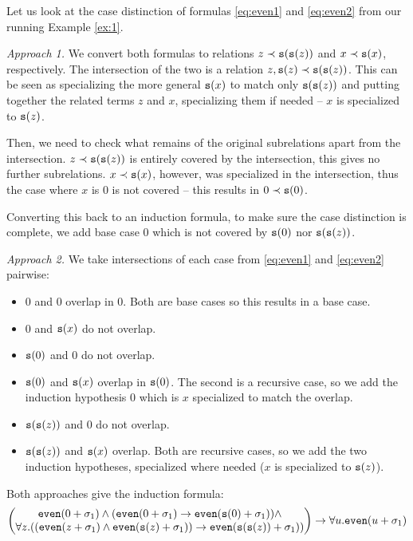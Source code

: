 \begin{example}
	Let us look at the case distinction of formulas \eqref{eq:even1} and \eqref{eq:even2} from our running Example \ref{ex:1}.

	\textit{Approach 1.} We convert both formulas to relations $z\prec\mathtt{s}(\mathtt{s}(z))$ and $x\prec\mathtt{s}(x)$, respectively. The intersection of the two is a relation $z,\mathtt{s}(z)\prec\mathtt{s}(\mathtt{s}(z))$. This can be seen as specializing the more general $\mathtt{s}(x)$ to match only $\mathtt{s}(\mathtt{s}(z))$ and putting together the related terms $z$ and $x$, specializing them if needed -- $x$ is specialized to $\mathtt{s}(z)$.

	Then, we need to check what remains of the original subrelations apart from the intersection. $z\prec\mathtt{s}(\mathtt{s}(z))$ is entirely covered by the intersection, this gives no further subrelations. $x\prec\mathtt{s}(x)$, however, was specialized in the intersection, thus the case where $x$ is 0 is not covered -- this results in $0\prec\mathtt{s}(0)$.

	Converting this back to an induction formula, to make sure the case distinction is complete, we add base case 0 which is not covered by $\mathtt{s}(0)$ nor $\mathtt{s}(\mathtt{s}(z))$.

	\textit{Approach 2.} We take intersections of each case from \eqref{eq:even1} and \eqref{eq:even2} pairwise:
	\begin{itemize}
		\item $0$ and $0$ overlap in $0$. Both are base cases so this results in a base case.
		\item $0$ and $\mathtt{s}(x)$ do not overlap.
		\item $\mathtt{s}(0)$ and $0$ do not overlap.
		\item $\mathtt{s}(0)$ and $\mathtt{s}(x)$ overlap in $\mathtt{s}(0)$. The second is a recursive case, so we add the induction hypothesis $0$ which is $x$ specialized to match the overlap.
		\item $\mathtt{s}(\mathtt{s}(z))$ and $0$ do not overlap.
		\item $\mathtt{s}(\mathtt{s}(z))$ and $\mathtt{s}(x)$ overlap. Both are recursive cases, so we add the two induction hypotheses, specialized where needed ($x$ is specialized to $\mathtt{s}(z)$).
	\end{itemize}

	Both approaches give the induction formula:
	\begin{equation}\begin{pmatrix}\mathtt{even}(0+\sigma_1)\land(\mathtt{even}(0+\sigma_1)\rightarrow\mathtt{even}(\mathtt{s}(0)+\sigma_1))\land\\
	\forall z.((\mathtt{even}(z+\sigma_1)\land\mathtt{even}(\mathtt{s}(z)+\sigma_1))\rightarrow\mathtt{even}(\mathtt{s}(\mathtt{s}(z))+\sigma_1))\end{pmatrix}\rightarrow \forall u.\mathtt{even}(u+\sigma_1)\end{equation}
\end{example}

